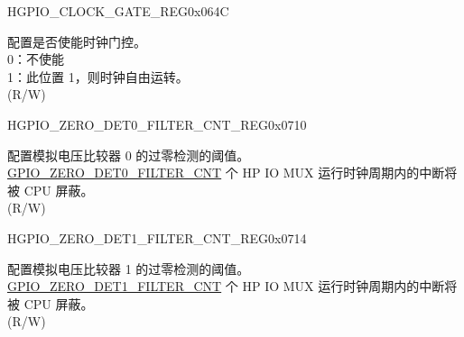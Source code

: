 \begin{register}{H}{GPIO\_CLOCK\_GATE\_REG}{0x064C}\label{regdesc:GPIOCLOCKGATEREG}
%
%
\regnewline%
\begin{regdesc}\begin{reglist}
\label{fielddesc:GPIOCLKEN}\item [GPIO\_CLK\_EN] 配置是否使能时钟门控。\\
0：不使能\\
1：此位置 1，则时钟自由运转。\\(R/W)
\end{reglist}\end{regdesc}
\end{register}

\begin{register}{H}{GPIO\_ZERO\_DET0\_FILTER\_CNT\_REG}{0x0710}\label{regdesc:GPIOZERODET0FILTERCNTREG}
%
\regnewline%
\begin{regdesc}\begin{reglist}
\label{fielddesc:GPIOZERODET0FILTERCNT}\item [GPIO\_ZERO\_DET0\_FILTER\_CNT] 配置模拟电压比较器 0 的过零检测的阈值。\hyperref[fielddesc:GPIOZERODET0FILTERCNT]{GPIO\_ZERO\_DET0\_FILTER\_CNT} 个 HP IO MUX 运行时钟周期内的中断将被 CPU 屏蔽。\\ (R/W)
\end{reglist}\end{regdesc}
\end{register}


\begin{register}{H}{GPIO\_ZERO\_DET1\_FILTER\_CNT\_REG}{0x0714}\label{regdesc:GPIOZERODET1FILTERCNTREG}
%
\regnewline%
\begin{regdesc}\begin{reglist}
\label{fielddesc:GPIOZERODET1FILTERCNT}\item [GPIO\_ZERO\_DET1\_FILTER\_CNT] 配置模拟电压比较器 1 的过零检测的阈值。\hyperref[fielddesc:GPIOZERODET1FILTERCNT]{GPIO\_ZERO\_DET1\_FILTER\_CNT} 个 HP IO MUX 运行时钟周期内的中断将被 CPU 屏蔽。\\ (R/W)
\end{reglist}\end{regdesc}
\end{register}


